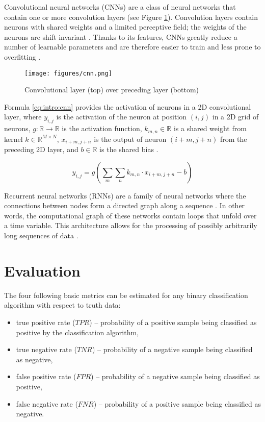 Convolutional neural networks (CNNs) are a class of neural networks that
contain one or more convolution layers (see Figure \ref{fig:intro:cnn}).
Convolution layers contain neurons with shared weights and a limited perceptive
field; the weights of the neurons are shift invariant
\cite[p.~326]{goodfellow2016deep}. Thanks to its features, CNNs greatly reduce
a number of learnable parameters and are therefore easier to train and less
prone to overfitting \cite[p.~339]{goodfellow2016deep}.

\begin{figure}
  \centering
  \texttt{[image: figures/cnn.png]}
  \caption{Convolutional layer (top) over preceding layer (bottom)
    \cite{dumoulin2016guide}}
  \label{fig:intro:cnn}
\end{figure}

Formula \ref{eq:intro:cnn} provides the activation of neurons in a 2D
convolutional layer, where $y_{i, j}$ is the activation of the neuron at
position $(i, j)$ in a 2D grid of neurons, $g: \mathbb{R} \rightarrow
\mathbb{R}$ is the activation function, $k_{m, n} \in \mathbb{R}$ is a shared
weight from kernel $k \in \mathbb{R}^{M \times N}$, $x_{i + m, j + n}$ is the
output of neuron $(i + m, j + n)$ from the preceding 2D layer, and $b \in
\mathbb{R}$ is the shared bias \cite[p.~328]{goodfellow2016deep}.

\begin{equation}
  y_{i, j} = g\left(\sum_m \sum_n k_{m, n} \cdot x_{i + m, j + n} - b\right)
  \label{eq:intro:cnn}
\end{equation}

Recurrent neural networks (RNNs) are a family of neural networks where the
connections between nodes form a directed graph along a sequence
\cite[p.~368]{goodfellow2016deep}. In other words, the computational graph of
these networks contain loops that unfold over a time variable. This
architecture allows for the processing of possibly arbitrarily long sequences
of data \cite[p.~367]{goodfellow2016deep}.

\section{\label{ch:background:evaluation}Evaluation}

The four following basic metrics can be estimated for any binary classification
algorithm with respect to truth data:

\begin{itemize}
  \item true positive rate ($\mathit{TPR}$) -- probability of a positive sample
    being classified as positive by the classification algorithm,
  \item true negative rate ($\mathit{TNR}$) -- probability of a negative sample
    being classified as negative,
  \item false positive rate ($\mathit{FPR}$) -- probability of a negative
    sample being classified as positive,
  \item false negative rate ($\mathit{FNR}$) -- probability of a positive
    sample being classified as negative.
\end{itemize}

